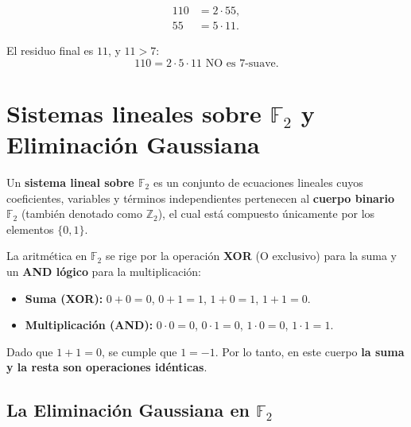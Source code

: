 \begin{ejemplo}[$m = 110$, $B = 7$]

\begin{align}
110 &= 2 \cdot 55,\\
55  &= 5 \cdot 11.
\end{align}

El residuo final es $11$, y $11 > 7$:
\begin{equation}
110 = 2 \cdot 5 \cdot 11 \text{ NO es } 7\text{-suave}.
\end{equation}
\end{ejemplo}

\section{Sistemas lineales sobre $\mathbb{F}_2$ y Eliminación Gaussiana}

Un \textbf{sistema lineal sobre $\mathbb{F}_2$} es un conjunto de ecuaciones lineales cuyos coeficientes, variables y términos independientes pertenecen al \textbf{cuerpo binario $\mathbb{F}_2$} (también denotado como $\mathbb{Z}_2$), el cual está compuesto únicamente por los elementos $\{0, 1\}$.

La aritmética en $\mathbb{F}_2$ se rige por la operación \textbf{XOR} (O exclusivo) para la suma y un \textbf{AND lógico} para la multiplicación:
\begin{itemize}
    \item \textbf{Suma (XOR):} $0 + 0 = 0$, \quad $0 + 1 = 1$, \quad $1 + 0 = 1$, \quad \textbf{$1 + 1 = 0$}.
    \item \textbf{Multiplicación (AND):} $0 \cdot 0 = 0$, \quad $0 \cdot 1 = 0$, \quad $1 \cdot 0 = 0$, \quad $1 \cdot 1 = 1$.
\end{itemize}

Dado que $1 + 1 = 0$, se cumple que $1 = -1$. Por lo tanto, en este cuerpo \textbf{la suma y la resta son operaciones idénticas}.

\subsection{La Eliminación Gaussiana en $\mathbb{F}_2$}

